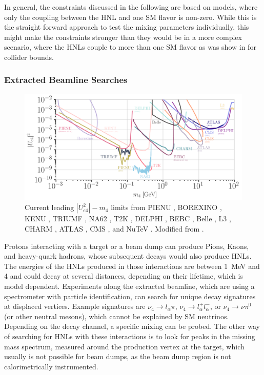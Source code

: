 In general, the constraints discussed in the following are based on models, where only the coupling between the HNL and one SM flavor is non-zero. While this is the straight forward approach to test the mixing parameters individually, this might make the constraints stronger than they would be in a more complex scenario, where the HNLs couple to more than one SM flavor as was show in  for collider bounds.


\subsubsection{Extracted Beamline Searches}

\begin{figure}[h]
    \includegraphics{figures/hnl_simulation/theory/UeN_majorana.png}
      \caption[Current leading $|U_{e4}^2|-m_4$ limits]{Current leading $|U_{e4}^2|-m_4$ limits from PIENU \cite{pienu_Bryman:2019bjg, PIENU:2017wbj}, BOREXINO \cite{Borexino:2013bot}, KENU , TRIUMF \cite{triumf_ue4_Britton1992ImprovedSF}, NA62 \cite{NA62:2022pyf}, T2K \cite{T2K:2019jwa}, DELPHI \cite{DELPHI:1996qcc}, BEBC \cite{Barouki:2022bkt}, Belle , L3 , CHARM \cite{CHARM:1983ayi}, ATLAS \cite{ATLAS:2019kpx, atlas_2022_HNL_PhysRevLett.131.061803}, CMS \cite{CMS:2018iaf, CMS:2022fut}, and NuTeV \cite{NuTeV:1999kej}. Modified from \cite{hoster_limitFernandez-Martinez:2023phj}.}
\end{figure}


Protons interacting with a target or a beam dump can produce Pions, Kaons, and heavy-quark hadrons, whose subsequent decays would also produce HNLs. The energies of the HNLs produced in those interactions are between \SI{1}{\mega\electronvolt} and \SI{4}{\gev} and could decay at several distances, depending on their lifetime, which is model dependent. Experiments along the extracted beamline, which are using a spectrometer with particle identification, can search for unique decay signatures at displaced vertices. Example signatures are $\nu_4 \rightarrow l_\alpha \pi$, $\nu_4 \rightarrow l^+_\alpha l^-_\alpha$, or $\nu_4 \rightarrow \nu \pi^0$ (or other neutral mesons), which cannot be explained by SM neutrinos. Depending on the decay channel, a specific mixing can be probed. The other way of searching for HNLs with these interactions is to look for peaks in the missing mass spectrum, measured around the production vertex at the target, which usually is not possible for beam dumps, as the beam dump region is not calorimetrically instrumented.

